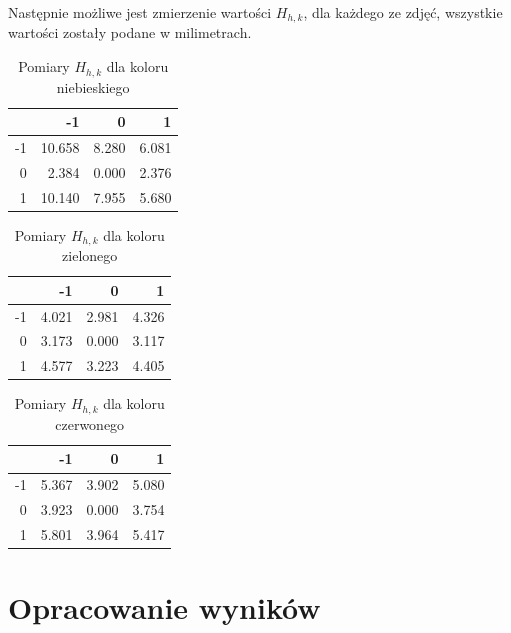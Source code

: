 \documentclass{article}
\begin{document}
Następnie możliwe jest zmierzenie wartości $H_{h,k}$, dla każdego ze zdjęć, wszystkie wartości zostały podane w milimetrach.
\begin{table}[H]
\centering
\begin{tabular}{r|rrr}
\multicolumn{1}{l|}{} & -1          & 0           & 1           \\ \hline
-1                    & 10.658 & 8.280 & 6.081 \\
0                     & 2.384  & 0.000 & 2.376 \\
1                     & 10.140 & 7.955 & 5.680
\end{tabular}
\caption{Pomiary $H_{h,k}$ dla koloru niebieskiego}
\end{table}

\begin{table}[H]
\centering
\begin{tabular}{r|rrr}
\multicolumn{1}{l|}{} & -1          & 0           & 1           \\ \hline
-1                    & 4.021  & 2.981 & 4.326 \\
0                     & 3.173  & 0.000 & 3.117 \\
1                     & 4.577  & 3.223 & 4.405 
\end{tabular}
\caption{Pomiary $H_{h,k}$ dla koloru zielonego}
\end{table}

\begin{table}[H]
\centering
\begin{tabular}{r|rrr}
\multicolumn{1}{l|}{} & -1          & 0           & 1           \\ \hline
-1                    & 5.367  & 3.902 & 5.080 \\
0                     & 3.923  & 0.000 & 3.754 \\
1                     & 5.801  & 3.964 & 5.417
\end{tabular}
\caption{Pomiary $H_{h,k}$ dla koloru czerwonego}
\end{table}

\clearpage



\section{Opracowanie wyników}
\end{document}
